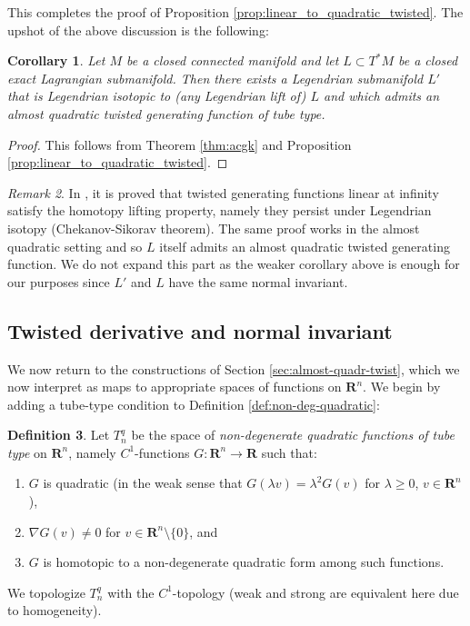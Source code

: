 \documentclass[reqno]{amsart}
\theoremstyle{theorem}
\newtheorem{corollary}{Corollary}[section]
\theoremstyle{remark}
\newtheorem{remark}[corollary]{Remark}
\theoremstyle{definition}
\newtheorem{definition}[corollary]{Definition}
\newcommand{\R}{\mathbf{R}}
\begin{document}
This completes the proof of Proposition \ref{prop:linear_to_quadratic_twisted}. The upshot of the above discussion is the following:


\begin{corollary}\label{cor:existence-quad-gf}
Let $M$ be a closed connected manifold and let $L \subset T^*M$ be a closed exact Lagrangian submanifold.
Then there exists a Legendrian submanifold $L'$ that is Legendrian isotopic to (any Legendrian lift of) 
$L$ and which admits an almost quadratic twisted generating function of tube type.
\end{corollary}


\begin{proof}
This follows from Theorem \ref{thm:acgk} and Proposition \ref{prop:linear_to_quadratic_twisted}.
\end{proof}


\begin{remark}
In \cite{ACGK}, it is proved that twisted generating functions linear at infinity satisfy the homotopy lifting property, namely they persist under Legendrian isotopy (Chekanov-Sikorav theorem). The same proof works in the almost quadratic setting and so $L$ itself admits an almost quadratic twisted generating function.
We do not expand this part as the weaker corollary above is enough for our purposes since $L'$ and $L$ have the same
normal invariant.
\end{remark}


\subsection{Twisted derivative and normal invariant}\label{subsec:twistedder}


We now return to the constructions of Section \ref{sec:almost-quadr-twist}, which we now interpret as maps to appropriate spaces of functions on $\R^n$. We begin by adding a tube-type condition to Definition \ref{def:non-deg-quadratic}:


\begin{definition} Let $T^q_n$ be the space of \emph{non-degenerate quadratic functions of tube type} on $\R^n$, namely $C^1$-functions $G:\R^n \to \R$ such that:
\begin{enumerate} 
\item $G$ is quadratic (in the weak sense that $G(\lambda v)=\lambda^2G(v)$ for $\lambda \geq 0$, $v\in \R^n$), 
\item $\nabla G (v)\neq 0$  for $v\in\R^n\setminus\{0\}$, and
\item $G$ is homotopic to a non-degenerate quadratic form among such functions.
\end{enumerate}
We topologize $T^q_n$ with the $C^1$-topology (weak and strong are equivalent here due to homogeneity).
\end{definition}
\end{document}
